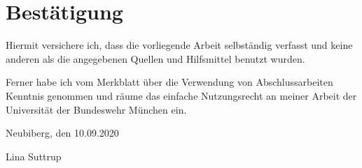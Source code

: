 \chapter*{Best\"atigung}

Hiermit versichere ich, dass die vorliegende Arbeit selbst\"andig verfasst und keine anderen als die angegebenen Quellen und Hilfsmittel benutzt wurden.

Ferner habe ich vom Merkblatt \"uber die Verwendung von Abschlussarbeiten Kenntnis genommen und r\"aume das einfache Nutzungsrecht an meiner Arbeit der Universit\"at der Bundeswehr M\"unchen ein.

\vspace{1cm}

Neubiberg, den 10.09.2020

\vspace{2cm} 

Lina Suttrup
